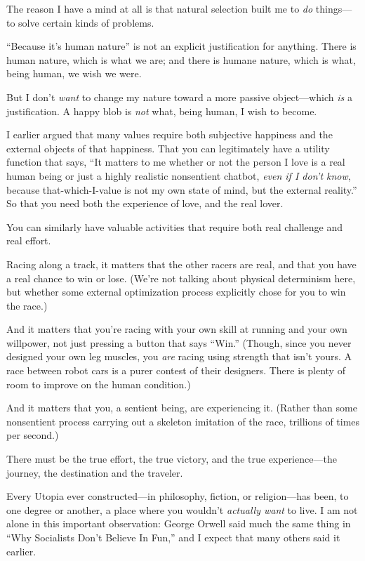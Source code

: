 {
 The reason I have a mind at all is that natural selection built me
to \textit{do} things---to solve certain kinds of problems.}

{
 ``Because it's human
nature'' is not an explicit justification for
anything. There is human nature, which is what we are; and there is
humane nature, which is what, being human, we wish we were.}

{
 But I don't \textit{want} to change my nature
toward a more passive object---which \textit{is} a justification. A
happy blob is \textit{not} what, being human, I wish to become.}

{
 I earlier argued that many values require both subjective
happiness and the external objects of that happiness. That you can
legitimately have a utility function that says, ``It
matters to me whether or not the person I love is a real human being or
just a highly realistic nonsentient chatbot, \textit{even if I
don't know}, because that-which-I-value is not my own
state of mind, but the external reality.'' So that
you need both the experience of love, and the real lover.}

{
 You can similarly have valuable activities that require both real
challenge and real effort.}

{
 Racing along a track, it matters that the other racers are real,
and that you have a real chance to win or lose. (We're
not talking about physical determinism here, but whether some external
optimization process explicitly chose for you to win the race.)}

{
 And it matters that you're racing with your own
skill at running and your own willpower, not just pressing a button
that says ``Win.'' (Though, since
you never designed your own leg muscles, you \textit{are} racing using
strength that isn't yours. A race between robot cars is
a purer contest of their designers. There is plenty of room to improve
on the human condition.)}

{
 And it matters that you, a sentient being, are experiencing it.
(Rather than some nonsentient process carrying out a skeleton imitation
of the race, trillions of times per second.)}

{
 There must be the true effort, the true victory, and the true
experience---the journey, the destination and the traveler.}

\myendsectiontext


{
 Every Utopia ever constructed---in philosophy, fiction, or
religion---has been, to one degree or another, a place where you
wouldn't \textit{actually want} to live. I am not alone
in this important observation: George Orwell said much the same thing
in ``Why Socialists Don't Believe In
Fun,'' and I expect that many others said it earlier.
}

